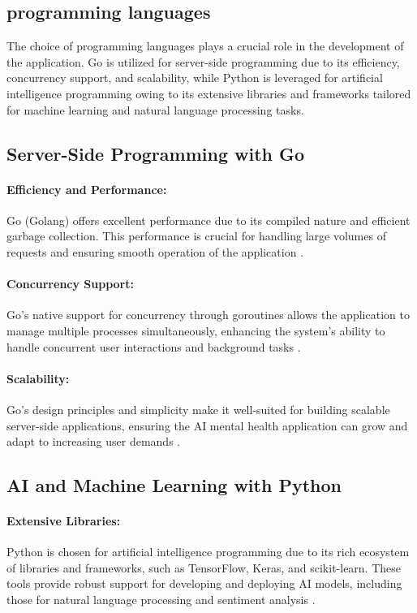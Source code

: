 \subsection{programming languages}

The choice of programming languages plays a crucial role in the development of the application. Go is utilized for server-side programming due to its efficiency, concurrency support, and scalability, while Python is leveraged for artificial intelligence programming owing to its extensive libraries and frameworks tailored for machine learning and natural language processing tasks.

\subsection{Server-Side Programming with Go}

\paragraph{Efficiency and Performance:} Go (Golang) offers excellent performance due to its compiled nature and efficient garbage collection. This performance is crucial for handling large volumes of requests and ensuring smooth operation of the application \cite{golang_efficiency}.

\paragraph{Concurrency Support:} Go’s native support for concurrency through goroutines allows the application to manage multiple processes simultaneously, enhancing the system’s ability to handle concurrent user interactions and background tasks \cite{golang_concurrency}.

\paragraph{Scalability:} Go’s design principles and simplicity make it well-suited for building scalable server-side applications, ensuring the AI mental health application can grow and adapt to increasing user demands \cite{golang_scalability}.

\subsection{AI and Machine Learning with Python}

\paragraph{Extensive Libraries:} Python is chosen for artificial intelligence programming due to its rich ecosystem of libraries and frameworks, such as TensorFlow, Keras, and scikit-learn. These tools provide robust support for developing and deploying AI models, including those for natural language processing and sentiment analysis \cite{tensorflow, keras, scikit_learn}.


